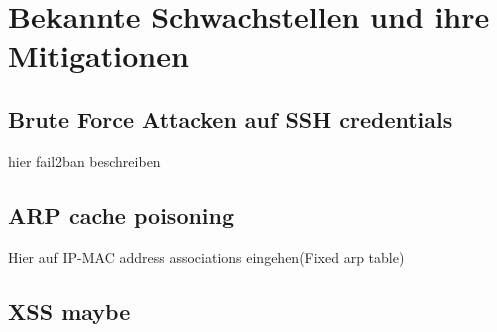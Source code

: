 
\section{Bekannte Schwachstellen und ihre Mitigationen}\label{sec:bekannte-schwachstellen-und-ihre-mitegationen}

\subsection{Brute Force Attacken auf SSH credentials}\label{subsec:fail2ban}
hier fail2ban beschreiben
\subsection{ARP cache poisoning}\label{subsec:arp-chache-poisoning}
Hier auf IP-MAC address associations eingehen(Fixed arp table)
\subsection{XSS maybe}
